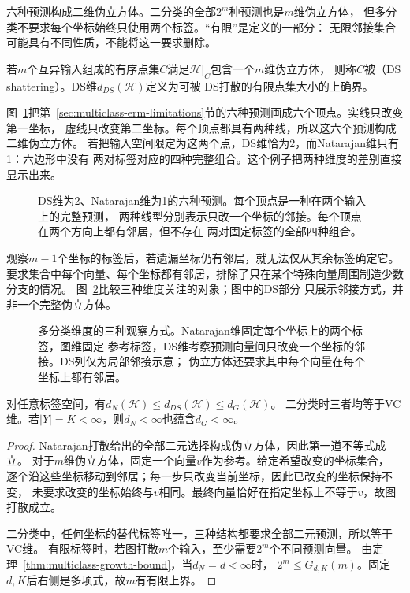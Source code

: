 六种预测构成二维伪立方体。二分类的全部$2^m$种预测也是$m$维伪立方体，
但多分类不要求每个坐标始终只使用两个标签。“有限”是定义的一部分：
无限邻接集合可能具有不同性质，不能将这一要求删除。

\begin{definition}[DS维]
\label{def:ds-dimension}
若$m$个互异输入组成的有序点集$C$满足$\mathcal H|_C$包含一个$m$维伪立方体，
则称$C$被（DS shattering）。DS维$d_{DS}(\mathcal H)$定义为可被
DS打散的有限点集大小的上确界。
\end{definition}

图~\ref{fig:ds-six-cycle}把第~\ref{sec:multiclass-erm-limitations}节的六种预测画成六个顶点。实线只改变第一坐标，
虚线只改变第二坐标。每个顶点都具有两种线，所以这六个预测构成二维伪立方体。
若把输入空间限定为这两个点，DS维恰为2，而Natarajan维只有1：六边形中没有
两对标签对应的四种完整组合。这个例子把两种维度的差别直接显示出来。

\begin{figure}[htbp]
 \centering
 
 \caption{DS维为2、Natarajan维为1的六种预测。每个顶点是一种在两个输入上的完整预测，
 两种线型分别表示只改一个坐标的邻接。每个顶点在两个方向上都有邻居，但不存在
 两对固定标签的全部四种组合。}
 \label{fig:ds-six-cycle}
\end{figure}
\FloatBarrier

观察$m-1$个坐标的标签后，若遗漏坐标仍有邻居，就无法仅从其余标签确定它。
要求集合中每个向量、每个坐标都有邻居，排除了只在某个特殊向量周围制造少数分支的情况。
图~\ref{fig:learning-multiclass-dimensions}比较三种维度关注的对象；图中的DS部分
只展示邻接方式，并非一个完整伪立方体。

\begin{figure}[htbp]
 \centering
 
 \caption{多分类维度的三种观察方式。Natarajan维固定每个坐标上的两个标签，图维固定
 参考标签，DS维考察预测向量间只改变一个坐标的邻接。DS列仅为局部邻接示意；
 伪立方体还要求其中每个向量在每个坐标上都有邻居。}
 \label{fig:learning-multiclass-dimensions}
\end{figure}

\begin{theorem}[多分类维度的比较]
\label{thm:multiclass-dimension-comparison}
对任意标签空间，有$d_N(\mathcal H)\leq d_{DS}(\mathcal H)\leq d_G(\mathcal H)$。
二分类时三者均等于VC维。若$|Y|=K<\infty$，则$d_N<\infty$也蕴含$d_G<\infty$。
\end{theorem}

\begin{proof}
Natarajan打散给出的全部二元选择构成伪立方体，因此第一道不等式成立。
对于$m$维伪立方体，固定一个向量$v$作为参考。给定希望改变的坐标集合，
逐个沿这些坐标移动到邻居；每一步只改变当前坐标，因此已改变的坐标保持不变，
未要求改变的坐标始终与$v$相同。最终向量恰好在指定坐标上不等于$v$，故图打散成立。

二分类中，任何坐标的替代标签唯一，三种结构都要求全部二元预测，所以等于VC维。
有限标签时，若图打散$m$个输入，至少需要$2^m$个不同预测向量。
由定理~\ref{thm:multiclass-growth-bound}，当$d_N=d<\infty$时，
$2^m\leq G_{d,K}(m)$。固定$d,K$后右侧是多项式，故$m$有有限上界。
\end{proof}


